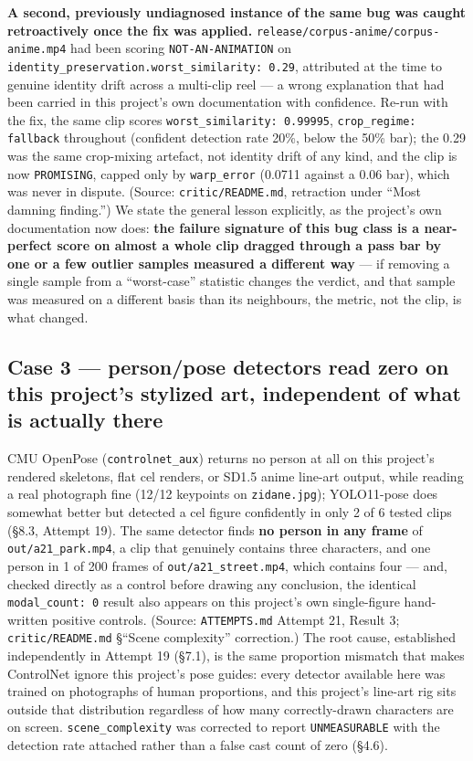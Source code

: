 \documentclass[11pt]{article}
\newcommand{\secsym}{\S}
\begin{document}
\textbf{A second, previously undiagnosed instance of the same bug was
caught retroactively once the fix was applied.}
\texttt{release/corpus-anime/corpus-anime.mp4} had been scoring
\texttt{NOT-AN-ANIMATION} on
\texttt{identity\_preservation.worst\_similarity: 0.29}, attributed at the
time to genuine identity drift across a multi-clip reel --- a wrong
explanation that had been carried in this project's own documentation with
confidence. Re-run with the fix, the same clip scores
\texttt{worst\_similarity: 0.99995}, \texttt{crop\_regime: fallback}
throughout (confident detection rate 20\%, below the 50\% bar); the 0.29
was the same crop-mixing artefact, not identity drift of any kind, and the
clip is now \texttt{PROMISING}, capped only by \texttt{warp\_error}
(0.0711 against a 0.06 bar), which was never in dispute. (Source:
\texttt{critic/README.md}, retraction under ``Most damning finding.'') We
state the general lesson explicitly, as the project's own documentation
now does: \textbf{the failure signature of this bug class is a
near-perfect score on almost a whole clip dragged through a pass bar by
one or a few outlier samples measured a different way} --- if removing a
single sample from a ``worst-case'' statistic changes the verdict, and
that sample was measured on a different basis than its neighbours, the
metric, not the clip, is what changed.

\subsection{Case 3 --- person/pose detectors read zero on this project's stylized art, independent of what is actually there}
\label{sec:case3}

CMU OpenPose (\texttt{controlnet\_aux}) returns no person at all on this
project's rendered skeletons, flat cel renders, or SD1.5 anime line-art
output, while reading a real photograph fine (12/12 keypoints on
\texttt{zidane.jpg}); YOLO11-pose does somewhat better but detected a cel
figure confidently in only 2 of 6 tested clips (\secsym8.3, Attempt 19).
The same detector finds \textbf{no person in any frame} of
\texttt{out/a21\_park.mp4}, a clip that genuinely contains three
characters, and one person in 1 of 200 frames of
\texttt{out/a21\_street.mp4}, which contains four --- and, checked
directly as a control before drawing any conclusion, the identical
\texttt{modal\_count: 0} result also appears on this project's own
single-figure hand-written positive controls. (Source:
\texttt{ATTEMPTS.md} Attempt 21, Result 3; \texttt{critic/README.md}
\secsym``Scene complexity'' correction.) The root cause, established
independently in Attempt 19 (\secsym7.1), is the same proportion mismatch
that makes ControlNet ignore this project's pose guides: every detector
available here was trained on photographs of human proportions, and this
project's line-art rig sits outside that distribution regardless of how
many correctly-drawn characters are on screen. \texttt{scene\_complexity}
was corrected to report \texttt{UNMEASURABLE} with the detection rate
attached rather than a false cast count of zero (\secsym4.6).
\end{document}
